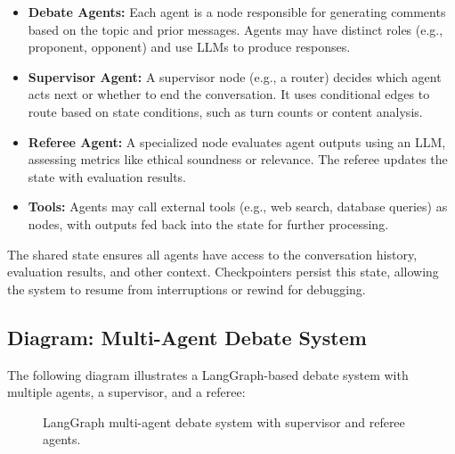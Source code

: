\documentclass{article}
\begin{document}
\begin{itemize}
    \item \textbf{Debate Agents:} Each agent is a node responsible for generating comments based on the topic and prior messages. Agents may have distinct roles (e.g., proponent, opponent) and use LLMs to produce responses.
    \item \textbf{Supervisor Agent:} A supervisor node (e.g., a router) decides which agent acts next or whether to end the conversation. It uses conditional edges to route based on state conditions, such as turn counts or content analysis.
    \item \textbf{Referee Agent:} A specialized node evaluates agent outputs using an LLM, assessing metrics like ethical soundness or relevance. The referee updates the state with evaluation results.
    \item \textbf{Tools:} Agents may call external tools (e.g., web search, database queries) as nodes, with outputs fed back into the state for further processing.
\end{itemize}

The shared state ensures all agents have access to the conversation history, evaluation results, and other context. Checkpointers persist this state, allowing the system to resume from interruptions or rewind for debugging.

\subsection{Diagram: Multi-Agent Debate System}

The following diagram illustrates a LangGraph-based debate system with multiple agents, a supervisor, and a referee:

\begin{figure}[h]
\centering
{}
\caption{LangGraph multi-agent debate system with supervisor and referee agents.}
\end{figure}
\end{document}
